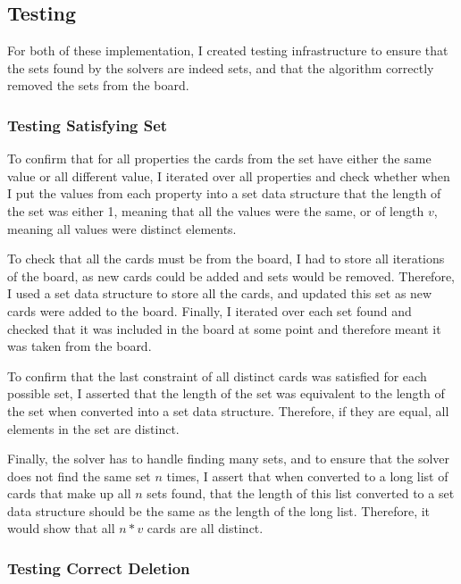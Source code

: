 \documentclass[pageno]{jpaper}
\begin{document}
\subsection{Testing}

For both of these implementation, I created testing infrastructure to ensure that the sets found by the solvers are indeed sets, and that the algorithm correctly removed the sets from the board. 

\subsubsection{Testing Satisfying Set}

To confirm that for all properties the cards from the set have either the same value or all different value, I iterated over all properties and check whether when I put the values from each property into a set data structure that the length of the set was either 1, meaning that all the values were the same, or of length $v$, meaning all values were distinct elements. 

To check that all the cards must be from the board, I had to store all iterations of the board, as new cards could be added and sets would be removed. Therefore, I used a set data structure to store all the cards, and updated this set as new cards were added to the board. Finally, I iterated over each set found and checked that it was included in the board at some point and therefore meant it was taken from the board. 

To confirm that the last constraint of all distinct cards was satisfied for each possible set, I asserted that the length of the set was equivalent to the length of the set when converted into a set data structure. Therefore, if they are equal, all elements in the set are distinct.

Finally, the solver has to handle finding many sets, and to ensure that the solver does not find the same set $n$ times, I assert that when converted to a long list of cards that make up all $n$ sets found, that the length of this list converted to a set data structure should be the same as the length of the long list. Therefore, it would show that all $n*v$ cards are all distinct. 

\subsubsection{Testing Correct Deletion}
\end{document}
